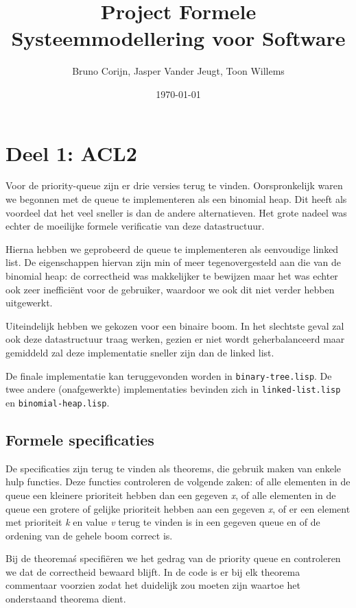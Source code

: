 \documentclass[a4paper,10pt]{article}
\title{Project Formele Systeemmodellering voor Software}
\author{Bruno Corijn, Jasper Vander Jeugt, Toon Willems}
\date{\today}
\begin{document}
\maketitle

\section{Deel 1: ACL2}

Voor de priority-queue zijn er drie versies terug te vinden. Oorspronkelijk
waren we begonnen met de queue te implementeren als een binomial heap. Dit heeft
als voordeel dat het veel sneller is dan de andere alternatieven. Het grote
nadeel was echter de moeilijke formele verificatie van deze datastructuur.

Hierna hebben we geprobeerd de queue te implementeren als eenvoudige linked
list. De eigenschappen hiervan zijn min of meer tegenovergesteld aan die van de
binomial heap: de correctheid was makkelijker te bewijzen maar het was echter
ook zeer ineffici\"ent voor de gebruiker, waardoor we ook dit niet verder hebben
uitgewerkt.

Uiteindelijk hebben we gekozen voor een binaire boom. In het slechtste geval zal
ook deze datastructuur traag werken, gezien er niet wordt geherbalanceerd maar
gemiddeld zal deze implementatie sneller zijn dan de linked list.

De finale implementatie kan teruggevonden worden in \texttt{binary-tree.lisp}.
De twee andere (onafgewerkte) implementaties bevinden zich in
\texttt{linked-list.lisp} en \texttt{binomial-heap.lisp}.

\subsection{Formele specificaties}

De specificaties zijn terug te vinden als theorems, die gebruik maken van enkele hulp functies. Deze functies controleren de volgende zaken: of alle elementen in de queue een kleinere prioriteit hebben dan een gegeven \emph{x}, of alle elementen in de queue een grotere of gelijke prioriteit hebben aan een gegeven \emph{x}, of er een element met prioriteit \emph{k} en value \emph{v} terug te vinden is in een gegeven queue en of de ordening van de gehele boom correct is.

Bij de theorema\'s specifi\"eren we het gedrag van de priority queue en controleren we dat de correctheid bewaard blijft. In de code is er bij elk theorema commentaar voorzien zodat het duidelijk zou moeten zijn waartoe het onderstaand theorema dient.
\end{document}
